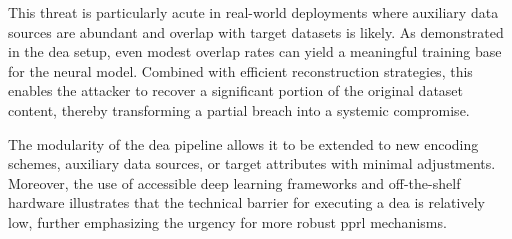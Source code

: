 This threat is particularly acute in real-world deployments where auxiliary data sources are abundant and overlap with target datasets is likely.
As demonstrated in the \ac{dea} setup, even modest overlap rates can yield a meaningful training base for the neural model.
Combined with efficient reconstruction strategies, this enables the attacker to recover a significant portion of the original dataset content, thereby transforming a partial breach into a systemic compromise.

The modularity of the \ac{dea} pipeline allows it to be extended to new encoding schemes, auxiliary data sources, or target attributes with minimal adjustments.
Moreover, the use of accessible deep learning frameworks and off-the-shelf hardware illustrates that the technical barrier for executing a \ac{dea} is relatively low, further emphasizing the urgency for more robust \ac{pprl} mechanisms.







